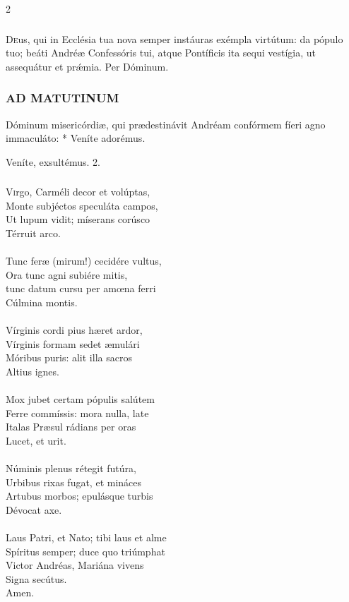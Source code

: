 \documentclass[9pt,twoside]{extarticle}
\begin{document}
\begin{multicols}{2}
\subsubsection*{\center {}}
\lettrine{D}eus, qui in Ecclésia tua nova semper instáuras exémpla virtútum: da pópulo tuo; beáti Andréæ Confessóris tui, atque Pontíficis ita sequi vestígia, ut assequátur et prǽmia. Per Dóminum.

\subsubsection*{\center \textsc{AD MATUTINUM}}
\begin{tightlist}{}
\item {} Dóminum misericórdiæ, qui prædestinávit Andréam confórmem fíeri agno immaculáto: * Veníte adorémus.
\item {} Veníte, exsultémus. 2.
\end{tightlist}

\subsubsection*{\center {}}
\lettrine{V}irgo, Carméli decor et volúptas,\\
Monte subjéctos speculáta campos,\\
Ut lupum vidit; míserans corúsco\\
Térruit arco.\\
\\
Tunc feræ (mirum!) cecidére vultus,\\
Ora tunc agni subiére mitis,\\
tunc datum cursu per amœna ferri\\
Cúlmina montis.\\
\\
Vírginis cordi pius hæret ardor,\\
Vírginis formam sedet æmulári\\
Móribus puris: alit illa sacros\\
Altius ignes.\\
\\
Mox jubet certam pópulis salútem\\
Ferre commíssis: mora nulla, late\\
Italas Præsul rádians per oras\\
Lucet, et urit.\\
\\
Núminis plenus rétegit futúra,\\
Urbibus rixas fugat, et mináces\\
Artubus morbos; epulásque turbis\\
Dévocat axe.\\
\\
Laus Patri, et Nato; tibi laus et alme\\
Spíritus semper; duce quo triúmphat\\
Victor Andréas, Mariána vivens\\
Signa secútus.\\
Amen.


\end{multicols}
\end{document}

